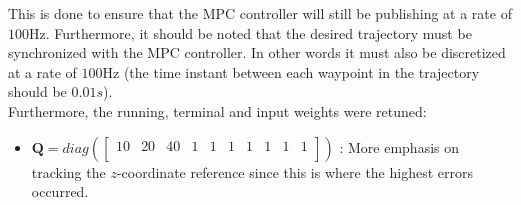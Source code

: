 \documentclass{thesisreport}
\begin{document}
This is done to ensure that the MPC controller will still be publishing at a rate of $100$Hz. Furthermore, it should be noted that the desired trajectory must be synchronized with the MPC controller. In other words it must also be discretized at a rate of $100$Hz (the time instant between each waypoint in the trajectory should be $0.01s$).\\

Furthermore, the running, terminal and input weights were retuned:

\begin{itemize}
	\item $\bm{Q} = diag(
	\begin{bmatrix}
			10 & 20 & 40 & 1 & 1 & 1 & 1 & 1 & 1 & 1\\
	\end{bmatrix})$ : More emphasis on tracking the $z$-coordinate reference since this is where the highest errors occurred.
	

\end{itemize}
\end{document}
